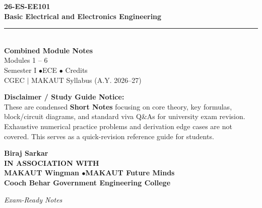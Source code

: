 \documentclass[12pt,a4paper]{article}
\begin{document}
\thispagestyle{empty}


\vspace*{1.0cm}
\begin{center}
  {\Huge\bfseries\color{myred} 26-ES-EE101}\\[10pt]
  {\LARGE\bfseries\color{mydark} Basic Electrical and Electronics Engineering}\\[20pt]
  {\color{myred}\rule{0.7\linewidth}{1.5pt}}\\[18pt]
  {\Large\color{myteal}\textbf{Combined Module Notes}}\\[8pt]
  {\large\color{mydark} Modules 1 -- 6}\\[40pt]
  {\normalsize\color{mydark} Semester I \quad$\bullet$\quad ECE \quad$\bullet$ Credits}\\[12pt]
  {\normalsize\color{mydark} CGEC \;$|$\; MAKAUT Syllabus (A.Y. 2026--27)}
\end{center}
\vspace{1.0cm}
\begin{center}
  \begin{tcolorbox}[colback=mygray, colframe=mgframe, boxrule=0.5pt, arc=3pt, width=0.85\linewidth]
    \centering\small\color{mydark}
    \textbf{Disclaimer / Study Guide Notice:}\\
    These are condensed \textbf{Short Notes} focusing on core theory, key formulas, block/circuit diagrams, and standard viva Q\&As for university exam revision. Exhaustive numerical practice problems and derivation edge cases are not covered. This serves as a quick-revision reference guide for students.
  \end{tcolorbox}
\end{center}
\vfill
\vspace{0.6cm}
\begin{center}
  {\large\bfseries\color{mypurple} Biraj Sarkar}\\[16pt]
  {\footnotesize\color{watermark}\textbf{IN ASSOCIATION WITH}}\\[8pt]
  {\small\bfseries\color{mydark} MAKAUT Wingman \quad$\bullet$\quad MAKAUT Future Minds}\\[12pt]
  {\large\bfseries\color{myteal} Cooch Behar Government Engineering College}
\end{center}
\vfill
\begin{center}{\small\color{watermark}\textit{Exam-Ready Notes}}\end{center}
\clearpage
\end{document}
